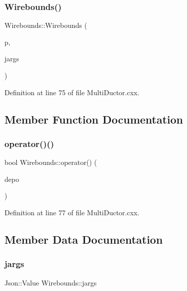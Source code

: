 \subsubsection{\texorpdfstring{Wirebounds()}{Wirebounds()}}
{\footnotesize\ttfamily Wirebounds\+::\+Wirebounds (\begin{DoxyParamCaption}\item[{const std\+::vector$<$ const \hyperlink{class_wire_cell_1_1_pimpos}{Pimpos} $\ast$$>$ \&}]{p,  }\item[{Json\+::\+Value}]{jargs }\end{DoxyParamCaption})\hspace{0.3cm}{\ttfamily [inline]}}



Definition at line 75 of file Multi\+Ductor.\+cxx.



\subsection{Member Function Documentation}
\mbox{\label{struct_wirebounds_ae82b5974ab795b29315f4926957cd13f}} 
\subsubsection{\texorpdfstring{operator()()}{operator()()}}
{\footnotesize\ttfamily bool Wirebounds\+::operator() (\begin{DoxyParamCaption}\item[{I\+Depo\+::pointer}]{depo }\end{DoxyParamCaption})\hspace{0.3cm}{\ttfamily [inline]}}



Definition at line 77 of file Multi\+Ductor.\+cxx.



\subsection{Member Data Documentation}
\mbox{\label{struct_wirebounds_acef75c3717cc50da1d04467ca5b2b576}} 
\subsubsection{\texorpdfstring{jargs}{jargs}}
{\footnotesize\ttfamily Json\+::\+Value Wirebounds\+::jargs}



